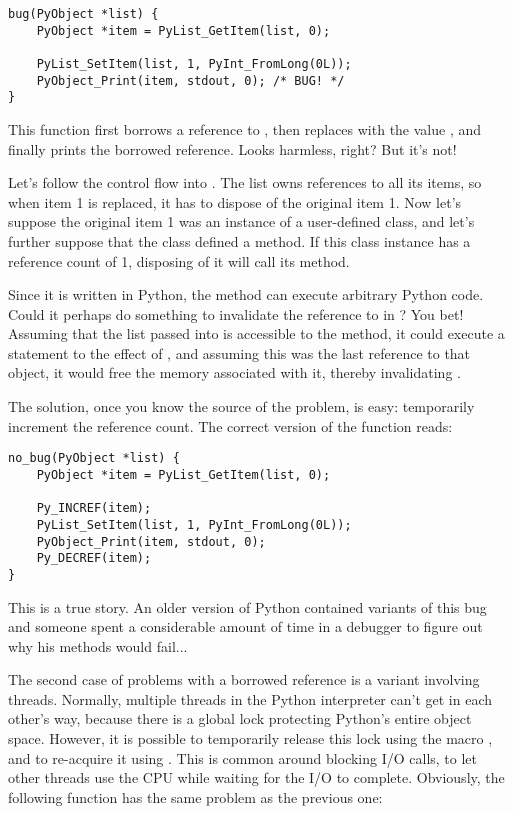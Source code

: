 \documentclass{manual}
\begin{document}
\begin{verbatim}
bug(PyObject *list) {
    PyObject *item = PyList_GetItem(list, 0);

    PyList_SetItem(list, 1, PyInt_FromLong(0L));
    PyObject_Print(item, stdout, 0); /* BUG! */
}
\end{verbatim}

This function first borrows a reference to , then
replaces  with the value , and finally prints
the borrowed reference.  Looks harmless, right?  But it's not!

Let's follow the control flow into .  The list
owns references to all its items, so when item 1 is replaced, it has
to dispose of the original item 1.  Now let's suppose the original
item 1 was an instance of a user-defined class, and let's further
suppose that the class defined a  method.  If this
class instance has a reference count of 1, disposing of it will call
its  method.

Since it is written in Python, the  method can execute
arbitrary Python code.  Could it perhaps do something to invalidate
the reference to  in ?  You bet!  Assuming
that the list passed into  is accessible to the
 method, it could execute a statement to the effect of
, and assuming this was the last reference to that
object, it would free the memory associated with it, thereby
invalidating .

The solution, once you know the source of the problem, is easy:
temporarily increment the reference count.  The correct version of the
function reads:

\begin{verbatim}
no_bug(PyObject *list) {
    PyObject *item = PyList_GetItem(list, 0);

    Py_INCREF(item);
    PyList_SetItem(list, 1, PyInt_FromLong(0L));
    PyObject_Print(item, stdout, 0);
    Py_DECREF(item);
}
\end{verbatim}

This is a true story.  An older version of Python contained variants
of this bug and someone spent a considerable amount of time in a \C{}
debugger to figure out why his  methods would fail...

The second case of problems with a borrowed reference is a variant
involving threads.  Normally, multiple threads in the Python
interpreter can't get in each other's way, because there is a global
lock protecting Python's entire object space.  However, it is possible
to temporarily release this lock using the macro
, and to re-acquire it using
.  This is common around blocking I/O
calls, to let other threads use the CPU while waiting for the I/O to
complete.  Obviously, the following function has the same problem as
the previous one:
\end{document}
